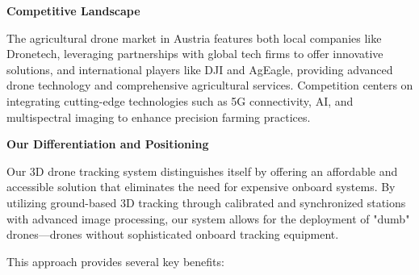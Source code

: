 \textbf{Competitive Landscape}

The agricultural drone market in Austria features both local companies like Dronetech, leveraging partnerships with global tech firms to offer innovative solutions, and international players like DJI and AgEagle, providing advanced drone technology and comprehensive agricultural services. Competition centers on integrating cutting-edge technologies such as 5G connectivity, AI, and multispectral imaging to enhance precision farming practices.

\textbf{Our Differentiation and Positioning}

Our 3D drone tracking system distinguishes itself by offering an affordable and accessible solution that eliminates the need for expensive onboard systems. By utilizing ground-based 3D tracking through calibrated and synchronized stations with advanced image processing, our system allows for the deployment of "dumb" drones—drones without sophisticated onboard tracking equipment.

This approach provides several key benefits:

